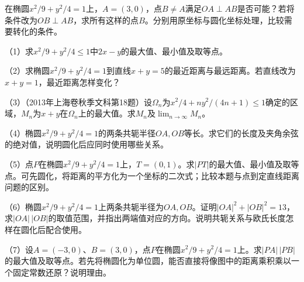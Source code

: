 \begin{samepage}
\begin{example}
在椭圆\(x^2/9+y^2/4=1\)上，\(A=(3,0)\)，点\(B\ne A\)满足\(OA\perp AB\)是否可能？若将条件改为\(OB\perp AB\)，求所有这样的点\(B\)。分别用原坐标与圆化坐标处理，比较需要转化的条件。
\end{example}
\end{samepage}

\begin{exercise}
\mbox{}\par\nobreak

\begin{samepage}
（1）求\(x^2/9+y^2/4\le1\)中\(2x-y\)的最大值、最小值及取等点。
\par
\end{samepage}

\begin{samepage}
（2）求椭圆\(x^2/9+y^2/4=1\)到直线\(x+y=5\)的最近距离与最远距离。若直线改为\(x+y=1\)，最近距离怎样变化？
\par
\end{samepage}

\begin{samepage}
（3）（2013年上海卷秋季文科第18题）设\(\Omega_n\)为\(x^2/4+ny^2/(4n+1)\le1\)确定的区域，\(M_n\)为\(x+y\)在\(\Omega_n\)上的最大值。求\(M_n\)及\(\lim_{n\to\infty}M_n\)。
\par
\end{samepage}
\begin{samepage}
（4）椭圆\(x^2/9+y^2/4=1\)的两条共轭半径\(OA,OB\)等长。求它们的长度及夹角余弦的绝对值，说明圆化后应同时使用哪些关系。
\par
\end{samepage}

\begin{samepage}
（5）点\(P\)在椭圆\(x^2/9+y^2/4=1\)上，\(T=(0,1)\)。求\(|PT|\)的最大值、最小值及取等点。可先圆化，将距离的平方化为一个坐标的二次式；比较本题与点到定直线距离问题的区别。
\par
\end{samepage}

\begin{samepage}
（6）椭圆\(x^2/9+y^2/4=1\)上两条共轭半径为\(OA,OB\)。证明\(|OA|^2+|OB|^2=13\)，求\(|OA|\,|OB|\)的取值范围，并指出两端值对应的方向。说明共轭关系与欧氏长度怎样在圆化后配合使用。
\par
\end{samepage}

\begin{samepage}
（7）设\(A=(-3,0)\)、\(B=(3,0)\)，点\(P\)在椭圆\(x^2/9+y^2/4=1\)上。求\(|PA|\,|PB|\)的最大值及取等点。若先将椭圆化为单位圆，能否直接将像图中的距离乘积乘以一个固定常数还原？说明理由。
\par
\end{samepage}


\end{exercise}
